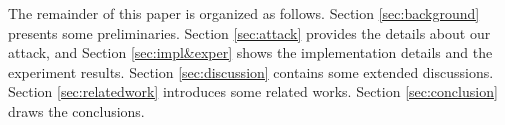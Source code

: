The remainder of this paper is organized as follows.
Section \ref{sec:background} presents some preliminaries.
Section \ref{sec:attack} provides the details about our attack,
and Section \ref{sec:impl&exper} shows the implementation details and the experiment results.
Section \ref{sec:discussion} contains some extended discussions.
Section \ref{sec:relatedwork} introduces some related works.
Section \ref{sec:conclusion} draws the conclusions.

%
%

